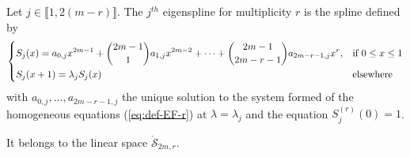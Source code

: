 \begin{deftn}\label{def:eigsplines-r}
  Let $j \in \llbracket1,2(m-r)\rrbracket$. The $j^{th}$ eigenspline for multiplicity $r$ is the spline defined by
  \begin{equation*}
    \begin{dcases}
      S_j(x) = a_{0,j}x^{2m-1} + \binom{2m-1}{1} a_{1,j} x^{2m-2} + \cdots + \binom{2m-1}{2m-r-1} a_{2m-r-1, j}x^r, & 
      \text{if} \ 0 \leq x \leq 1 \\
      S_j(x+1) = \lambda_j S_j(x) & \text{elsewhere}
    \end{dcases}
  \end{equation*}
  with $a_{0,j}, \ldots, a_{2m-r-1,j}$ the unique solution to the system formed of the homogeneous equations 
  (\ref{eq:def-EF-r}) at $\lambda = \lambda_j$ and the equation $S_j^{(r)}(0) = 1$. 
  
  It belongs to the linear space $\mathring{\mathscr{S}}_{2m,r}$.
\end{deftn}

